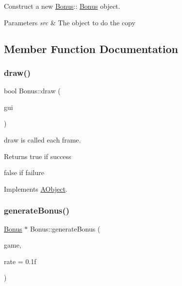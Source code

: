 Construct a new \hyperlink{class_bonus}{Bonus}\+:\+: \hyperlink{class_bonus}{Bonus} object. 


\begin{DoxyParams}{Parameters}
{\em src} & The object to do the copy \\
\hline
\end{DoxyParams}


\subsection{Member Function Documentation}
\mbox{\label{class_bonus_acdb40deca7be37984084fb3d4fef85ed}} 
\subsubsection{\texorpdfstring{draw()}{draw()}}
{\footnotesize\ttfamily bool Bonus\+::draw (\begin{DoxyParamCaption}\item[{\hyperlink{class_gui}{Gui} \&}]{gui }\end{DoxyParamCaption})\hspace{0.3cm}{\ttfamily [virtual]}}



draw is called each frame. 

\begin{DoxyReturn}{Returns}
true if success 

false if failure 
\end{DoxyReturn}


Implements \hyperlink{class_a_object_a5e454e13e04ee937c20a465244cf748a}{A\+Object}.

\mbox{\label{class_bonus_a69c5cd0fdef8eef925b5d295696b19a9}} 
\subsubsection{\texorpdfstring{generate\+Bonus()}{generateBonus()}}
{\footnotesize\ttfamily \hyperlink{class_bonus}{Bonus} $\ast$ Bonus\+::generate\+Bonus (\begin{DoxyParamCaption}\item[{\hyperlink{class_scene_game}{Scene\+Game} \&}]{game,  }\item[{float}]{rate = {\ttfamily 0.1f} }\end{DoxyParamCaption})\hspace{0.3cm}{\ttfamily [static]}}



